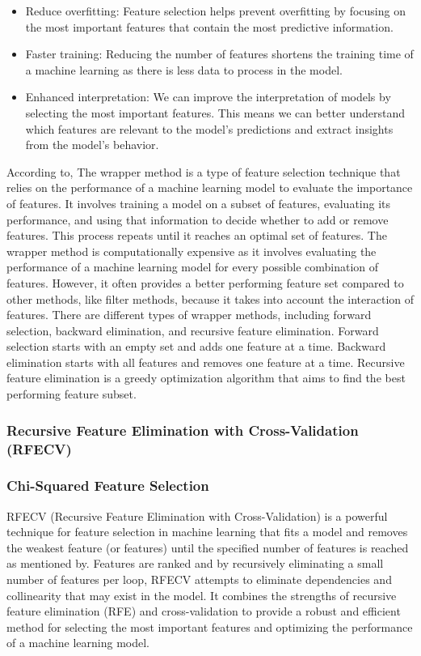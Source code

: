 \documentclass[12pt]{report}
\begin{document}
\begin{itemize}
    \item Reduce overfitting: Feature selection helps prevent overfitting by focusing on
          the most important features that contain the most predictive information.
    \item Faster training: Reducing the number of features shortens the training time of
          a machine learning as there is less data to process in the model.
    \item Enhanced interpretation: We can improve the interpretation of models by
          selecting the most important features. This means we can better understand
          which features are relevant to the model's predictions and extract insights
          from the model's behavior.

\end{itemize}

According to\cite{kohavi1997}, The wrapper method is a type of feature
selection technique that relies on the performance of a machine learning model
to evaluate the importance of features. It involves training a model on a
subset of features, evaluating its performance, and using that information to
decide whether to add or remove features. This process repeats until it reaches
an optimal set of features. The wrapper method is computationally expensive as
it involves evaluating the performance of a machine learning model for every
possible combination of features. However, it often provides a better
performing feature set compared to other methods, like filter methods, because
it takes into account the interaction of features. There are different types of
wrapper methods, including forward selection, backward elimination, and
recursive feature elimination. Forward selection starts with an empty set and
adds one feature at a time. Backward elimination starts with all features and
removes one feature at a time. Recursive feature elimination is a greedy
optimization algorithm that aims to find the best performing feature subset.\\

\subsubsection*{Recursive Feature Elimination with Cross-Validation (RFECV)}
\subsubsection*{Chi-Squared Feature Selection}
RFECV (Recursive Feature Elimination with Cross-Validation) is a powerful
technique for feature selection in machine learning that fits a model and
removes the weakest feature (or features) until the specified number of
features is reached as mentioned by\cite{guyon2002}. Features are ranked and
by recursively eliminating a small number of features per loop, RFECV attempts
to eliminate dependencies and collinearity that may exist in the model. It
combines the strengths of recursive feature elimination (RFE) and
cross-validation to provide a robust and efficient method for selecting the
most important features and optimizing the performance of a machine learning
model.\\
\end{document}
